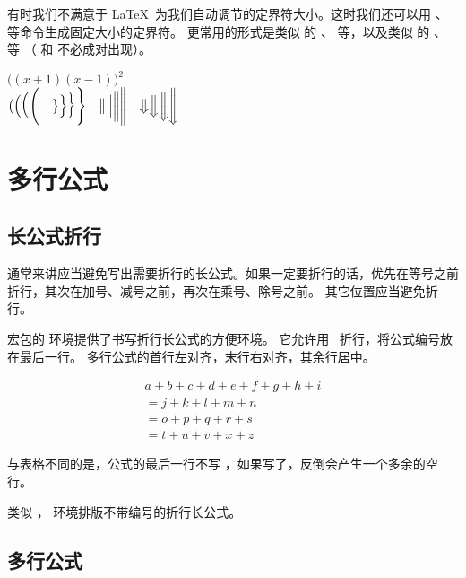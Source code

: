 有时我们不满意于 \LaTeX\ 为我们自动调节的定界符大小。这时我们还可以用 、 等命令生成固定大小的定界符。
更常用的形式是类似  的 、 等，以及类似  的 、 等
（ 和  不必成对出现）。
\begin{example}
$\Big((x+1)(x-1)\Big)^{2}$\\
$\bigl( \Bigl( \biggl( \Biggl( 
\quad
\bigr\} \Bigr\} \biggr\} \Biggr\} 
\quad
\big\| \Big\| \bigg\| \Bigg\| 
\quad
\big\Downarrow \Big\Downarrow
\bigg\Downarrow \Bigg\Downarrow$
\end{example}

\section{多行公式}\label{sec:multi-eqns}

\subsection{长公式折行}\label{sec:multline}

通常来讲应当避免写出需要折行的长公式。如果一定要折行的话，优先在等号之前折行，其次在加号、减号之前，再次在乘号、除号之前。
其它位置应当避免折行。

 宏包的  环境提供了书写折行长公式的方便环境。
它允许用 \crcmd\ 折行，将公式编号放在最后一行。
多行公式的首行左对齐，末行右对齐，其余行居中。
\begin{example}
\begin{multline}
a + b + c + d + e + f
+ g + h + i \\
= j + k + l + m + n\\
= o + p + q + r + s\\
= t + u + v + x + z
\end{multline}
\end{example}

与表格不同的是，公式的最后一行不写 \crcmd，如果写了，反倒会产生一个多余的空行。

类似 ， 环境排版不带编号的折行长公式。

\subsection{多行公式}\label{subsec:align}

